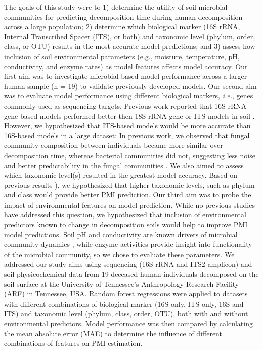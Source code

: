 \documentclass[
  10pt,
  letterpaper,
]{article}
\begin{document}
The goals of this study were to 1) determine the utility of soil
microbial communities for predicting decomposition time during human
decomposition across a large population; 2) determine which biological
marker (16S rRNA, Internal Transcribed Spacer (ITS), or both) and
taxonomic level (phylum, order, class, or OTU) results in the most
accurate model predictions; and 3) assess how inclusion of soil
environmental parameters (e.g., moisture, temperature, pH, conductivity,
and enzyme rates) as model features affects model accuracy. Our first
aim was to investigate microbial-based model performance across a larger
human sample (n = 19) to validate previously developed models. Our
second aim was to evaluate model performance using different biological
markers, \emph{i.e.}, genes commonly used as sequencing targets.
Previous work reported that 16S rRNA gene-based models performed better
then 18S rRNA gene or ITS models in soil \citep{belk_microbiome_2018}.
However, we hypothesized that ITS-based models would be more accurate
than 16S-based models in a large dataset: In previous work, we observed
that fungal community composition between individuals became more
similar over decomposition time, whereas bacterial communities did not,
suggesting less noise and better predictability in the fungal
communities \citep{mason_body_2022}. We also aimed to assess which
taxonomic level(s) resulted in the greatest model accuracy. Based on
previous results \citep{belk_microbiome_2018, mason_body_2022}), we
hypothesized that higher taxonomic levels, such as phylum and class
would provide better PMI prediction. Our third aim was to probe the
impact of environmental features on model prediction. While no previous
studies have addressed this question, we hypothesized that inclusion of
environmental predictors known to change in decomposition soils would
help to improve PMI model predictions. Soil pH and conductivity are
known drivers of microbial community dynamics
\citep{lauber_pyrosequencing-based_2009, rath_linking_2019}, while
enzyme activities provide insight into functionality of the microbial
community, so we chose to evaluate these parameters. We addressed our
study aims using sequencing (16S rRNA and ITS2 amplicon) and soil
physicochemical data from 19 deceased human individuals
\citep{mason_body_2022} decomposed on the soil surface at the University
of Tennessee's Anthropology Research Facility (ARF) in Tennessee, USA.
Random forest regressions were applied to datasets with different
combinations of biological marker (16S only, ITS only, 16S and ITS) and
taxonomic level (phylum, class, order, OTU), both with and without
environmental predictors. Model performance was then compared by
calculating the mean absolute error (MAE) to determine the influence of
different combinations of features on PMI estimation.
\end{document}
